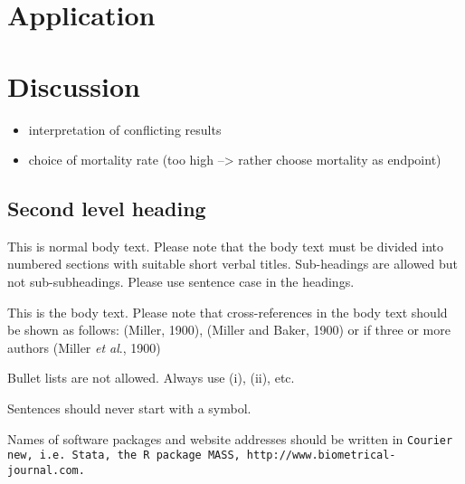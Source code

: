 \documentclass[bimj,fleqn]{w-art}\usepackage[]{graphicx}\usepackage[]{color}
\theoremstyle{plain}
\theoremstyle{definition}
\begin{document}
  \section{Application}
  \label{sec:Application}

  \section{Discussion}
  \label{sec:Discussion}
  \begin{itemize}
  \item interpretation of conflicting results
  \item choice of mortality rate (too high --> rather choose mortality as endpoint)
\end{itemize}



  \subsection{Second level heading}
  This is normal body text. Please note that the body text must be divided into numbered sections with
  suitable short verbal titles. Sub-headings are allowed but not sub-subheadings. Please use sentence case in the
  headings.

  This is the body text. Please note that cross-references in the body text should be shown as follows:
  (Miller, 1900), (Miller and Baker, 1900) or if three or more authors (Miller {\it{et al}}., 1900)
  \vspace*{12pt}

  \noindent Bullet lists are not allowed. Always use (i), (ii), etc.
  \vspace*{12pt}

  \noindent Sentences should never start with a symbol.
  \vspace*{12pt}

  \noindent Names of software packages and website addresses should be written in {\tt{Courier new, i.e. Stata, the R package
  MASS, http://www.biometrical-journal.com.}}
\end{document}
